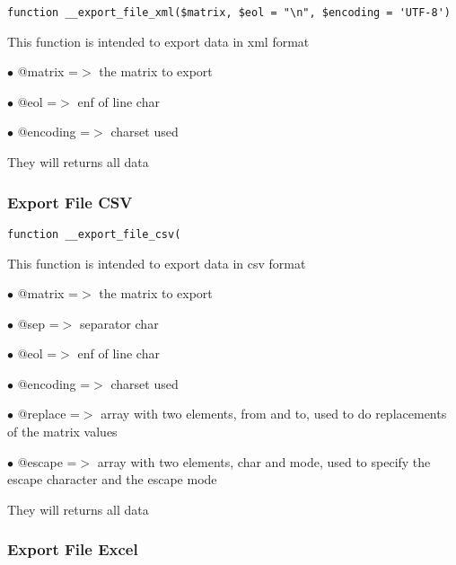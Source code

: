 \documentclass[a4paper]{article}
\begin{document}
\begin{lstlisting}
function __export_file_xml($matrix, $eol = "\n", $encoding = 'UTF-8')
\end{lstlisting}

This function is intended to export data in xml format

\begin{compactitem}
\item[\color{myblue}$\bullet$] @matrix   =$>$ the matrix to export
\item[\color{myblue}$\bullet$] @eol      =$>$ enf of line char
\item[\color{myblue}$\bullet$] @encoding =$>$ charset used
\end{compactitem}

They will returns all data

\hypertarget{toc440}{}
\subsubsection{Export File CSV}

\begin{lstlisting}
function __export_file_csv(
\end{lstlisting}

This function is intended to export data in csv format

\begin{compactitem}
\item[\color{myblue}$\bullet$] @matrix   =$>$ the matrix to export
\item[\color{myblue}$\bullet$] @sep      =$>$ separator char
\item[\color{myblue}$\bullet$] @eol      =$>$ enf of line char
\item[\color{myblue}$\bullet$] @encoding =$>$ charset used
\item[\color{myblue}$\bullet$] @replace  =$>$ array with two elements, from and to, used to do replacements of the matrix values
\item[\color{myblue}$\bullet$] @escape   =$>$ array with two elements, char and mode, used to specify the escape character and the
             escape mode
\end{compactitem}

They will returns all data

\hypertarget{toc441}{}
\subsubsection{Export File Excel}
\end{document}
